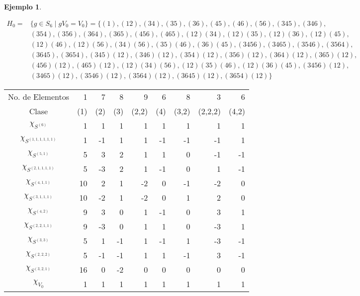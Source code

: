 \documentclass[12pt]{book}
\theoremstyle{definition}
\newtheorem{example}[theorem]{Ejemplo}
\newcounter{in}
\begin{document}
\begin{example}
  \begin{footnotesize}
    \begin{align*}
      H_{0}=&\{g\in S_{6}\mid
      gV_{0}=V_{0}\}=\{(1),(12),(34),(35),(36),(45),(46),(56),(345),(346),\\
      &(354),(356),(364),(365),(456),(465),(12)(34),(12)(35),(12)(36),(12)(45),\\
      &(12)(46),(12)(56),(34)(56),(35)(46),(36)(45),(3456),(3465),(3546),(3564),\\
      &(3645),(3654),(345)(12),(346)(12),(354)(12),(356)(12),(364)(12),(365)(12),\\
      &(456)(12),(465)(12),(12)(34)(56),(12)(35)(46),(12)(36)(45),(3456)(12),\\
      &(3465)(12),(3546)(12),(3564)(12),(3645)(12),(3654)(12)\}
    \end{align*}
  \end{footnotesize}

 \begin{table}[!hbtp]
    \centering
    \begin{tabular}{c |r r r r r r r r}
      No. de Elementos  & 1 & 7 & 8 & 9 & 6 & 8 & 3 & 6  \\
      Clase&(1)& (2) & (3) & (2,2) & (4)& (3,2) & (2,2,2) & (4,2)\\
      \hline
      $\chi_{S^{{(6)}}}$         & 1 & 1  & 1  & 1 & 1 & 1 & 1 & 1 \\
      $\chi_{S^{{(1,1,1,1,1,1)}}}$ & 1 & -1 & 1  & 1 & -1&-1 &-1 & 1 \\
      $\chi_{S^{{(5,1)}}}$       & 5 & 3  & 2  & 1 & 1 & 0 &-1 &-1 \\
      $\chi_{S^{{(2,1,1,1,1)}}}$  & 5 & -3 &  2 & 1 &-1 & 0 & 1 &-1  \\
      $\chi_{S^{{(4,1,1)}}}$     & 10& 2  & 1  & -2& 0 &-1 &-2 & 0  \\
      $\chi_{S^{{(3,1,1,1)}}}$    & 10&-2  & 1  &-2 & 0 & 1 & 2 & 0 \\
      $\chi_{S^{{(4,2)}}}$       & 9 & 3  & 0  & 1 & -1& 0 & 3 & 1 \\
      $\chi_{S^{{(2,2,1,1)}}}$    & 9 & -3 & 0  & 1 & 1 & 0 &-3 & 1 \\
      $\chi_{S^{{(3,3)}}}$       & 5 & 1  & -1  & 1 &-1 &1 & -3& -1 \\
      $\chi_{S^{{(2,2,2)}}}$     & 5  & -1& -1  & 1 & 1 & -1& 3 & -1 \\
      $\chi_{S^{{(3,2,1)}}}$     & 16 & 0 & -2  & 0 & 0 & 0 & 0 & 0 \\
      \hline
      $\chi_{V_{0}}$        & 1 & 1 & 1 & 1 & 1 & 1 &1 & 1  \\
    \end{tabular}


\end{table}
\end{example}
\end{document}
